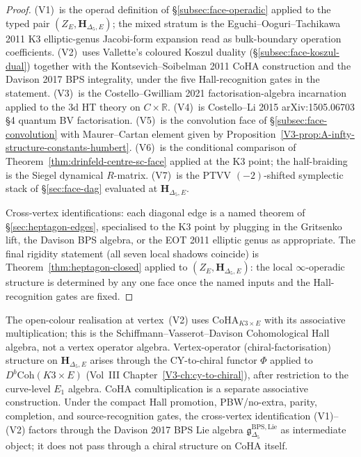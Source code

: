 \begin{proof}
(V1)~is the operad definition of \S\ref{subsec:face-operadic} applied
to the typed pair $(Z_E,\mathbf H_{\Delta_5,E})$; the mixed stratum is the
Eguchi--Ooguri--Tachikawa 2011 K3 elliptic-genus Jacobi-form expansion
read as bulk-boundary operation coefficients.
(V2)~uses Vallette's coloured Koszul duality
(\S\ref{subsec:face-koszul-dual}) together with the Kontsevich--Soibelman
2011 CoHA construction and the Davison 2017 BPS integrality, under the
five Hall-recognition gates in the statement.
(V3)~is the Costello--Gwilliam 2021 factorisation-algebra incarnation
applied to the $3$d HT theory on $C \times \mathbb{R}$.
(V4)~is Costello--Li 2015 arXiv:1505.06703 \S 4 quantum BV
factorisation.
(V5)~is the convolution face of \S\ref{subsec:face-convolution} with
Maurer--Cartan element given by
Proposition~\ref{V3-prop:A-infty-structure-constants-humbert}.
(V6)~is the conditional comparison of
Theorem~\ref{thm:drinfeld-centre-sc-face} applied at the K3 point;
the half-braiding is the Siegel dynamical $R$-matrix.
(V7)~is the PTVV $(-2)$-shifted symplectic stack of
\S\ref{sec:face-dag} evaluated at $\mathbf{H}_{\Delta_5,E}$.

Cross-vertex identifications: each diagonal edge is a named theorem of
\S\ref{sec:heptagon-edges}, specialised to the K3 point by plugging in
the Gritsenko lift, the Davison BPS algebra, or the EOT 2011 elliptic
genus as appropriate. The final rigidity statement (all seven local
shadows coincide) is Theorem~\ref{thm:heptagon-closed} applied to
$(Z_E,\mathbf H_{\Delta_5,E})$: the local $\infty$-operadic structure
is determined by any one face once the named inputs and the
Hall-recognition gates are fixed.
\end{proof}

\begin{remark}
\label{rem:heptagon-K3-coha-discipline}
The open-colour realisation at vertex~(V2) uses
$\mathrm{CoHA}_{K3 \times E}$ with its associative multiplication; this
is the Schiffmann--Vasserot--Davison Cohomological Hall algebra, not a
vertex operator algebra. Vertex-operator (chiral-factorisation)
structure on $\mathbf{H}_{\Delta_5,E}$ arises through the
CY-to-chiral functor $\Phi$ applied to $D^b\mathrm{Coh}(K3 \times E)$
(Vol~III Chapter~\ref{V3-ch:cy-to-chiral}), after restriction to the
curve-level $E_1$ algebra. CoHA comultiplication is a separate
associative construction. Under the compact Hall promotion,
PBW/no-extra, parity, completion, and source-recognition gates, the
cross-vertex identification (V1)--(V2) factors through the Davison 2017
BPS Lie algebra
$\mathfrak{g}_{\Delta_5}^{\mathrm{BPS,Lie}}$ as intermediate object;
it does not pass through a chiral structure on CoHA itself.
\end{remark}

